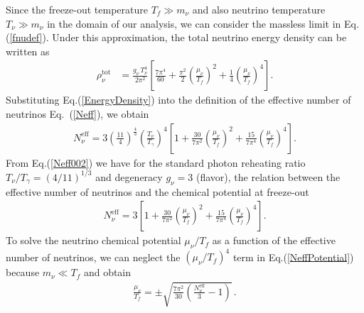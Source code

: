 Since the freeze-out temperature $T_f\gg m_\nu$ and also neutrino temperature $T_\nu\gg m_\nu$ in the domain of our analysis, we can consider the massless limit in Eq.\;(\ref{fnudef}). Under this approximation, the total neutrino energy density can be written as
\begin{align}
\label{EnergyDensity}
\rho_\nu^{\mathrm{tot}}
&=\frac{g_\nu\,T_\nu^4}{2\pi^2}\left[\frac{7\pi^4}{60}+\frac{\pi^2}{2}\left(\frac{\mu_\nu}{T_f}\right)^{\!\!2}+\frac{1}{4}\left(\frac{\mu_\nu}{T_f}\right)^{\!\!4}\right].
\end{align}
Substituting Eq.\;(\ref{EnergyDensity}) into the definition of the effective number of neutrinos Eq.~(\ref{Neff}), we obtain 
\begin{align}
\label{Neff002}
N_\nu^{\mathrm{eff}}\!\!
=\!3\!\left(\frac{11}{4}\right)^{\!\!\frac{4}{3}}\!\!\left(\frac{T_\nu}{T_\gamma}\right)^{\!\!4}\!
\left[1\!+\!\frac{30}{7\pi^2}\!\!\left(\frac{\mu_\nu}{T_f}\right)^{\!\!2} 
\!\!+\frac{15}{7\pi^4}\!\!\left(\frac{\mu_\nu}{T_f}\right)^{\!\!4}\right].
\end{align}
From Eq.\;(\ref{Neff002}) we have for the standard photon reheating ratio $T_\nu/T_\gamma=(4/11)^{1/3}$ \cite{Kolb:1990vq} and degeneracy $g_\nu=3$ (flavor), the relation between the effective number of neutrinos and the chemical potential at freeze-out
\begin{align}
\label{NeffPotential}
N_\nu^{\mathrm{eff}}=3\left[1+\frac{30}{7\pi^2}\left(\frac{\mu_\nu}{T_f}\right)^{\!\!2}+ \frac{15}{7\pi^4} \left(\frac{\mu_\nu}{T_f}\right)^{\!\!4}\right].
\end{align}
To solve the neutrino chemical potential $\mu_\nu/T_f$ as a function of the effective number of neutrinos, we can neglect the $(\mu_\nu/T_f)^4$ term in Eq.\;(\ref{NeffPotential}) because $m_\nu\ll T_f$ and obtain
\begin{align}\label{Solution}
\frac{\mu_\nu}{T_f}=\pm\sqrt{\frac{7\pi^2}{30}\left(\frac{N_\nu^{\mathrm{eff}}}{3}-1\right)}\,.
\end{align}

